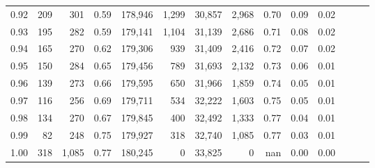\begin{tabular}{rrrrrrrrrrrrrr}
0.92 &    209 &    301 &  0.59 &  178,946 &    1,299 &  30,857 &   2,968 &  0.70 &  0.09 &      0.02 \\
0.93 &    195 &    282 &  0.59 &  179,141 &    1,104 &  31,139 &   2,686 &  0.71 &  0.08 &      0.02 \\
0.94 &    165 &    270 &  0.62 &  179,306 &      939 &  31,409 &   2,416 &  0.72 &  0.07 &      0.02 \\
0.95 &    150 &    284 &  0.65 &  179,456 &      789 &  31,693 &   2,132 &  0.73 &  0.06 &      0.01 \\
0.96 &    139 &    273 &  0.66 &  179,595 &      650 &  31,966 &   1,859 &  0.74 &  0.05 &      0.01 \\
0.97 &    116 &    256 &  0.69 &  179,711 &      534 &  32,222 &   1,603 &  0.75 &  0.05 &      0.01 \\
0.98 &    134 &    270 &  0.67 &  179,845 &      400 &  32,492 &   1,333 &  0.77 &  0.04 &      0.01 \\
0.99 &     82 &    248 &  0.75 &  179,927 &      318 &  32,740 &   1,085 &  0.77 &  0.03 &      0.01 \\
1.00 &    318 &  1,085 &  0.77 &  180,245 &        0 &  33,825 &       0 &   nan &  0.00 &      0.00 \\
\bottomrule
\end{tabular}
